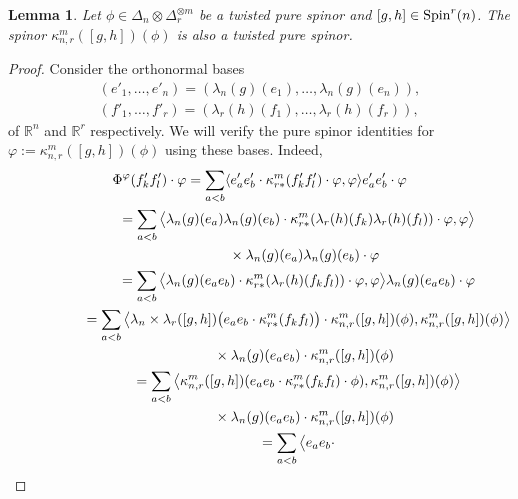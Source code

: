 \documentclass[pdftex]{sigma}
\numberwithin{equation}{section}
\newtheorem{Lemma}[Theorem]{Lemma}
\begin{document}
\begin{Lemma}\label{lemma: orbit of pure spinor} Let $\phi\in\Delta_n\otimes\Delta_r^{\otimes m}$ be a twisted pure spinor and $[g,h]\in {\rm Spin}^{r}(n)$. The spinor $\kappa_{n,r}^m([g,h])(\phi)$ is also a twisted pure spinor.
\end{Lemma}
\begin{proof} Consider the orthonormal bases
\begin{gather*}
(e'_1,\dots,e'_n)=(\lambda_n(g)(e_1),\dots,\lambda_n(g)(e_n)),\\
(f'_1,\dots,f'_r)=(\lambda_r(h)(f_1),\dots,\lambda_r(h)(f_r)),
\end{gather*}
of $\mathbb{R}^n$ and $\mathbb{R}^r$ respectively.
We will verify the pure spinor identities for $\varphi:=\kappa_{n,r}^m([g,h])(\phi)$ using these bases.
Indeed,{\samepage
\begin{gather*}
 \Phi^\varphi(f'_kf'_l) \cdot \varphi = \sum_{a<b} \langle e'_ae'_b\cdot \kappa_{r*}^m(f'_kf'_l)\cdot \varphi,\varphi\rangle e'_ae'_b\cdot\varphi\\
 \hphantom{\Phi^\varphi(f'_kf'_l) \cdot \varphi}{} = \sum_{a<b} \big\langle \lambda_n(g)(e_a)\lambda_n(g)(e_b)\cdot
\kappa_{r*}^m(\lambda_r(h)(f_k)\lambda_r(h)(f_l))\cdot \varphi,\varphi\big\rangle\\
\hphantom{\Phi^\varphi(f'_kf'_l) \cdot \varphi=}{}\times \lambda_n(g)(e_a)\lambda_n(g)(e_b)\cdot\varphi\\
\hphantom{\Phi^\varphi(f'_kf'_l) \cdot \varphi}{}
 = \sum_{a<b} \big\langle \lambda_n(g)(e_ae_b)\cdot
\kappa_{r*}^m(\lambda_r(h)(f_kf_l))\cdot \varphi,\varphi\big\rangle
\lambda_n(g)(e_ae_b)\cdot\varphi\\
\hphantom{\Phi^\varphi(f'_kf'_l) \cdot \varphi}{}
 = \sum_{a<b} \big\langle \lambda_n\times\lambda_r([g,h])\big(e_ae_b\cdot
\kappa_{r*}^m(f_kf_l)\big)\cdot \kappa_{n,r}^m([g,h])(\phi),\kappa_{n,r}^m([g,h])(\phi)\big\rangle\\
\hphantom{\Phi^\varphi(f'_kf'_l) \cdot \varphi=}{}\times
\lambda_n(g)(e_ae_b)\cdot\kappa_{n,r}^m([g,h])(\phi)\\
\hphantom{\Phi^\varphi(f'_kf'_l) \cdot \varphi}{}
 = \sum_{a<b} \big\langle \kappa_{n,r}^m([g,h])(e_ae_b\cdot
\kappa_{r*}^m(f_kf_l)\cdot \phi),\kappa_{n,r}^m([g,h])(\phi)\big\rangle\\
\hphantom{\Phi^\varphi(f'_kf'_l) \cdot \varphi=}{}\times
\lambda_n(g)(e_ae_b)\cdot\kappa_{n,r}^m([g,h])(\phi)\\
 \hphantom{\Phi^\varphi(f'_kf'_l) \cdot \varphi}{}
 = \sum_{a<b} \big\langle e_ae_b\cdot

\end{gather*}}
\end{proof}
\end{document}
